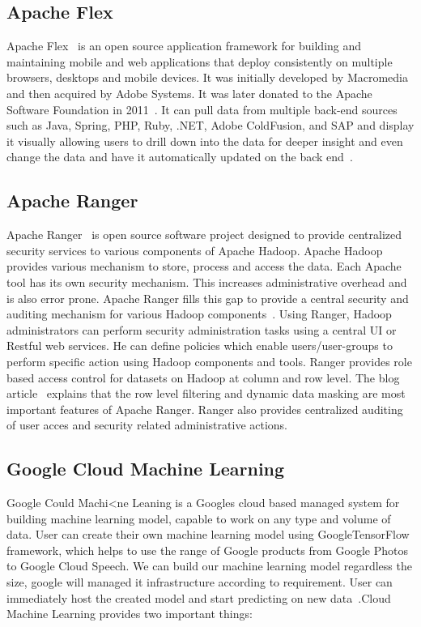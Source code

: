 {\subsection{Apache Flex \cv}

Apache Flex~\cite{www-flex} is an open source application framework
for building and maintaining mobile and web applications that deploy
consistently on multiple browsers, desktops and mobile devices. It was
initially developed by Macromedia and then acquired by Adobe
Systems. It was later donated to the Apache Software Foundation in
2011~\cite{blog-flex}. It can pull data from multiple back-end sources
such as Java, Spring, PHP, Ruby, .NET, Adobe ColdFusion, and SAP and
display it visually allowing users to drill down into the data for
deeper insight and even change the data and have it automatically
updated on the back end~\cite{wiki-flex}.

\subsection{Apache Ranger \cv}

Apache Ranger~\cite{www-apache-ranger} is open source software project
designed to provide centralized security services to various
components of Apache Hadoop. Apache Hadoop provides various mechanism
to store, process and access the data. Each Apache tool has its own
security mechanism. This increases administrative overhead and is also
error prone.  Apache Ranger fills this gap to provide a central
security and auditing mechanism for various Hadoop
components~\cite{www-ranger-architecture}. Using Ranger, Hadoop
administrators can perform security administration tasks using a
central UI or Restful web services. He can define policies which
enable users/user-groups to perform specific action using Hadoop
components and tools. Ranger provides role based access control for
datasets on Hadoop at column and row level.  The blog
article~\cite{www-ranger-key-features} explains that the row level
filtering and dynamic data masking are most important features of
Apache Ranger. Ranger also provides centralized auditing of user acces
and security related administrative actions.
     
\subsection{Google Cloud Machine Learning}
     
Google Could Machi<ne Leaning is a Googles cloud based managed system
for building machine learning model, capable to work on any type and
volume of data. User can create their own machine learning model using
GoogleTensorFlow framework, which helps to use the range of Google
products from Google Photos to Google Cloud Speech.  We can build our
machine learning model regardless the size, google will managed it
infrastructure according to requirement. User can immediately host the
created model and start predicting on new
data~\cite{www-googlecloudmachinelearning}.Cloud Machine Learning
provides two important things:
     
}

